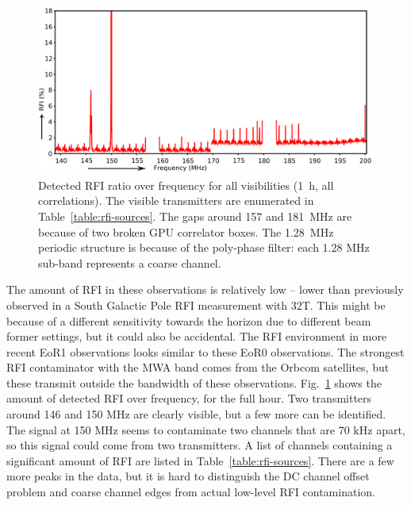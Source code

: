 \documentclass[a4paper,10pt]{article}
\begin{document}
\begin{figure}
\begin{center}
\includegraphics[width=12cm]{rfi-spectrum.pdf}
\caption{Detected RFI ratio over frequency for all visibilities (1~h, all correlations). The visible transmitters are enumerated in Table~\ref{table:rfi-sources}. The gaps around 157 and 181~MHz are because of two broken GPU correlator boxes. The 1.28~MHz periodic structure is because of the poly-phase filter: each 1.28 MHz sub-band represents a coarse channel. }
\label{fig:rfi-spectrum}
\end{center}
\end{figure}

The amount of RFI in these observations is relatively low -- lower than previously observed in a South Galactic Pole RFI measurement with 32T. This might be because of a different sensitivity towards the horizon due to different beam former settings, but it could also be accidental. The RFI environment in more recent EoR1 observations looks similar to these EoR0 observations. The strongest RFI contaminator with the MWA band comes from the Orbcom satellites, but these transmit outside the bandwidth of these observations. Fig.~\ref{fig:rfi-spectrum} shows the amount of detected RFI over frequency, for the full hour. Two transmitters around 146 and 150 MHz are clearly visible, but a few more can be identified. The signal at 150 MHz seems to contaminate two channels that are 70 kHz apart, so this signal could come from two transmitters. A list of channels containing a significant amount of RFI are listed in Table~\ref{table:rfi-sources}. There are a few more peaks in the data, but it is hard to distinguish the DC channel offset problem and coarse channel edges from actual low-level RFI contamination. 
\end{document}
